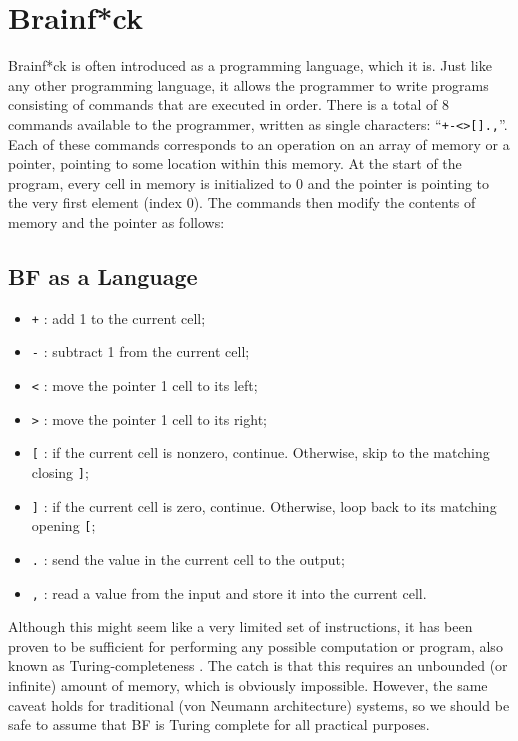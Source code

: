 \section{Brainf*ck}\label{section:brainfck}                                                       
Brainf*ck is often introduced as a programming language, which it is. Just like any other programming language, it allows the programmer to write programs consisting of commands that are executed in order. There is a total of 8 commands available to the programmer, written as single characters: ``\texttt{+-<>[].,}''. Each of these commands corresponds to an operation on an array of memory or a pointer, pointing to some location within this memory. At the start of the program, every cell in memory is initialized to 0 and the pointer is pointing to the very first element (index 0). The commands then modify the contents of memory and the pointer as follows:
\subsection{BF as a Language}
\begin{itemize}
\item \texttt{+} : add 1 to the current cell;
\item \texttt{-} : subtract 1 from the current cell;
\item \texttt{<} : move the pointer 1 cell to its left;
\item \texttt{>} : move the pointer 1 cell to its right;
\item \texttt{[} : if the current cell is nonzero, continue. Otherwise, skip to the matching closing \texttt{]};
\item \texttt{]} : if the current cell is zero, continue. Otherwise, loop back to its matching opening \texttt{[};
  \item \texttt{.} : send the value in the current cell to the output;
  \item \texttt{,} : read a value from the input and store it into the current cell.
\end{itemize}
Although this might seem like a very limited set of instructions, it has been proven to be sufficient for performing any possible computation or program, also known as Turing-completeness \cite{esolang}. The catch is that this requires an unbounded (or infinite) amount of memory, which is obviously impossible. However, the same caveat holds for traditional (von Neumann architecture) systems, so we should be safe to assume that BF is Turing complete for all practical purposes.

